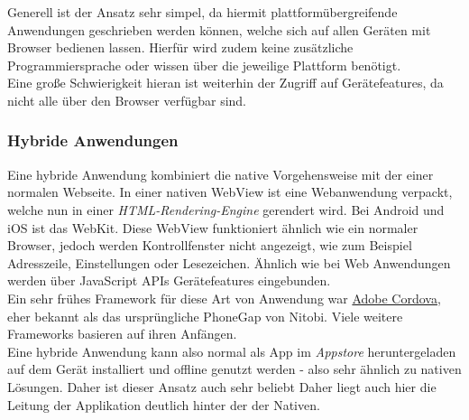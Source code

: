 Generell ist der Ansatz sehr simpel, da hiermit plattformübergreifende Anwendungen geschrieben werden können, welche sich auf allen Geräten mit Browser bedienen lassen. 
Hierfür wird zudem keine zusätzliche Programmiersprache oder wissen über die jeweilige Plattform benötigt.\\
Eine große Schwierigkeit hieran ist weiterhin der Zugriff auf Gerätefeatures, da nicht alle über den Browser verfügbar sind.

\subsubsection{Hybride Anwendungen}
\label{hybride_anwendung}
Eine hybride Anwendung kombiniert die native Vorgehensweise mit der einer normalen Webseite. 
In einer nativen WebView ist eine Webanwendung verpackt, welche nun in einer \textit{HTML-Rendering-Engine} gerendert wird. Bei Android und iOS ist das WebKit.
Diese WebView funktioniert ähnlich wie ein normaler Browser, jedoch werden Kontrollfenster nicht angezeigt, wie zum Beispiel Adresszeile, Einstellungen oder Lesezeichen.
Ähnlich wie bei Web Anwendungen werden über JavaScript APIs Gerätefeatures eingebunden.\\
Ein sehr frühes Framework für diese Art von Anwendung war \href{https://cordova.apache.org/}{Adobe Cordova}, eher bekannt als das ursprüngliche PhoneGap von Nitobi. Viele weitere Frameworks basieren auf ihren Anfängen.\\

Eine hybride Anwendung kann also normal als App im \textit{Appstore} heruntergeladen auf dem Gerät installiert und offline genutzt werden - also sehr ähnlich zu nativen Lösungen. Daher ist dieser Ansatz auch sehr beliebt 
Daher liegt auch hier die Leitung der Applikation deutlich hinter der der Nativen. \cite{lachgar2017} \cite{bjorn-hansen2020}

